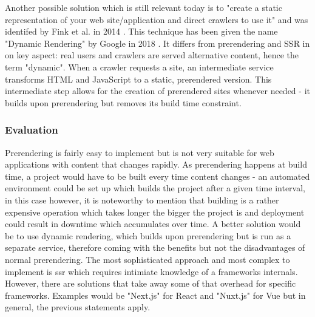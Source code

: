 Another possible solution which is still relevant today is to "create a static representation of your web site/application and direct crawlers to use it" and was identifed by Fink et al. in 2014 \cite[p.~270]{Fink2014:inbook}. This technique has been given the name "Dynamic Rendering" by Google in 2018 \cite{DynamicRenderingGoogle:online}. It differs from prerendering and SSR in on key aspect: real users and crawlers are served alternative content, hence the term "dynamic". When a crawler requests a site, an intermediate service transforms HTML and JavaScript to a static, prerendered version. This intermediate step allows for the creation of prerendered sites whenever needed - it builds upon prerendering but removes its build time constraint.


\subsubsection{Evaluation}
Prerendering is fairly easy to implement but is not very suitable for web applications with content that changes rapidly. As prerendering happens at build time, a project would have to be built every time content changes - an automated environment could be set up which builds the project after a given time interval, in this case however, it is noteworthy to mention that building is a rather expensive operation which takes longer the bigger the project is and deployment could result in downtime which accumulates over time. A better solution would be to use dynamic rendering, which builds upon prerendering but is run as a separate service, therefore coming with the benefits but not the disadvantages of normal prerendering. The most sophisticated approach and most complex to implement is \acrshort{ssr} which requires intimiate knowledge of a frameworks internals. However, there are solutions that take away some of that overhead for specific frameworks. Examples would be "Next.js" for React and "Nuxt.js" for Vue but in general, the previous statements apply. 
